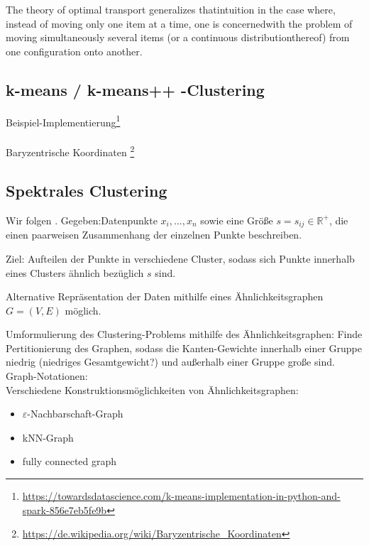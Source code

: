 \documentclass[11pt,a4paper]{article}
\numberwithin{equation}{section}
\begin{document}
	The theory of optimal transport generalizes thatintuition in the case where, instead of moving only one item at a time, one is concernedwith the problem of moving simultaneously several items (or a continuous distributionthereof) from one configuration onto another.\cite{computationalOT}
	\subsection{k-means / k-means++ -Clustering}
	
	Beispiel-Implementierung\footnote{\url{https://towardsdatascience.com/k-means-implementation-in-python-and-spark-856e7eb5fe9b}}\\
	\\
	Baryzentrische Koordinaten \footnote{\url{https://de.wikipedia.org/wiki/Baryzentrische_Koordinaten}}
	
	\subsection{Spektrales Clustering}
	Wir folgen \cite{spectralClustering_tut}.
	Gegeben:Datenpunkte $x_i, ..., x_n$ sowie eine Größe $s = s_{ij} \in \mathbb{R}^{+}$, die einen paarweisen Zusammenhang der einzelnen Punkte beschreiben.
	
	Ziel: Aufteilen der Punkte in verschiedene Cluster, sodass sich Punkte innerhalb eines Clusters ähnlich bezüglich $s$ sind.
	
	Alternative Repräsentation der Daten mithilfe eines Ähnlichkeitsgraphen $G=(V,E)$ möglich.
	
	Umformulierung des Clustering-Problems mithilfe des Ähnlichkeitsgraphen: Finde Pertitionierung des Graphen, sodass die Kanten-Gewichte innerhalb einer Gruppe niedrig (niedriges Gesamtgewicht?) und außerhalb einer Gruppe große sind.\\
	
	
	Graph-Notationen:\\
	
	Verschiedene Konstruktionsmöglichkeiten von Ähnlichkeitsgraphen:
	
	\begin{itemize}
		\item $\varepsilon$-Nachbarschaft-Graph\\
		\item kNN-Graph\\
		\item fully connected graph
	\end{itemize}
	
\end{document}
